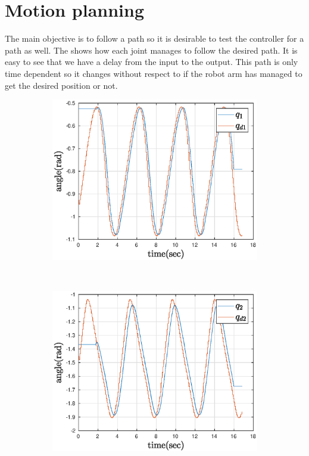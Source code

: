 \section{Motion planning}



The main objective is to follow a path so it is desirable to test the controller for a path as well. The  shows how each joint manages to follow the desired path. It is easy to see that we have a delay from the input to the output. This path is only time dependent so it changes without respect to if the robot arm has managed to get the desired position or not.\\
\def\picsSiz{1.08}
\begin{figure}[htbp]
    \centering
    \begin{subfigure}[htbp]{0.45\textwidth}
        \centering
        \includegraphics[width = \picsSiz\linewidth]{img/pathF1.eps}
        \caption{ }
    \end{subfigure}
    ~ 
    \begin{subfigure}[htbp]{0.45\textwidth}
        \centering
        \includegraphics[width = \picsSiz\linewidth]{img/pathF2.eps}

\end{subfigure}
\end{figure}
